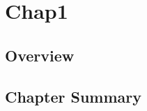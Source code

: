 \chapter{Chap1}
\label{chap:1}
\section{Overview}
\label{sec:ch1overview}
\section{Chapter Summary}
\label{sec:ch1summary}

